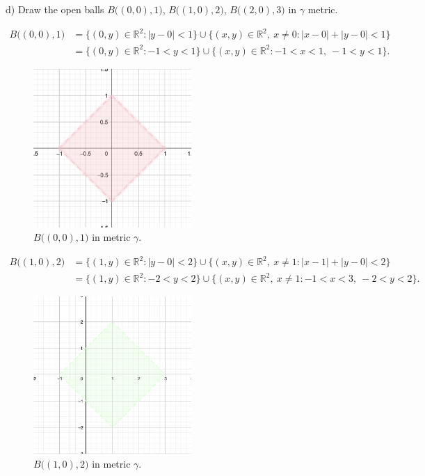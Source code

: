 \documentclass[a4paper,11pt]{article}
\begin{document}
\noindent
d) Draw the open balls $B \big((0, 0), 1 \big)$, $B \big((1, 0), 2 \big)$, $B \big((2, 0), 3  \big)$ in $\gamma$ metric. 

\begin{align*} 
    B \big((0, 0), 1 \big) &= \{(0,y) \in \mathbb{R}^2 : |y - 0| < 1 \} \cup \{(x,y) \in \mathbb{R}^2 , \ x \neq 0: |x - 0| + |y - 0| < 1 \}
    \\
    &= \{(0,y) \in \mathbb{R}^2 : -1 < y < 1 \} \cup \{(x,y) \in \mathbb{R}^2 : -1 < x < 1, \ -1 < y < 1 \}.
\end{align*}

\begin{figure}[ht!]
    \centering
    \includegraphics[width=60mm]{d1.png}
    \caption{$B \big((0, 0), 1 \big)$ in metric $\gamma$.}
\end{figure}

\begin{align*} 
    B \big((1, 0), 2 \big) &= \{(1,y) \in \mathbb{R}^2 : |y - 0| < 2 \} \cup \{(x,y) \in \mathbb{R}^2, \ x \neq 1 : |x - 1| + |y - 0| < 2 \}
    \\
    &= \{(1,y) \in \mathbb{R}^2 : -2 < y < 2 \} \cup \{(x,y) \in \mathbb{R}^2 , \ x \neq 1: -1 < x < 3, \ -2 < y < 2 \}.
\end{align*}

\begin{figure}[ht!]
    \centering
    \includegraphics[width=60mm]{d2.png}
    \caption{$B \big((1, 0), 2 \big)$ in metric $\gamma$.}
\end{figure}
\end{document}
